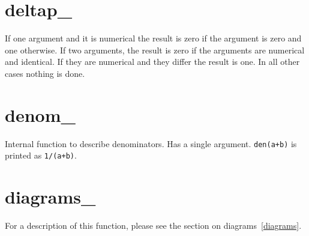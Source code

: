 
\section{deltap\_}
\label{fundeltap}
\noindent If one argument and it is numerical the result is zero if 
the argument is zero and one otherwise. If two arguments, the result is 
zero if the arguments are numerical and identical. If they are numerical and 
they differ the result is one. In all other cases nothing is done.


\section{denom\_}
\label{fundenom}
\noindent Internal function to describe denominators. Has a single 
argument. \verb:den(a+b): is printed as \verb:1/(a+b):.


\section{diagrams\_}
\label{fundiagrams}
\noindent For a description of this function, please see the section on 
diagrams~\ref{diagrams}.


